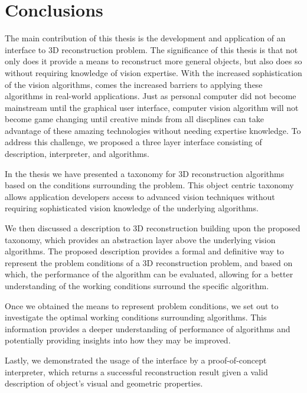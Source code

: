 
\chapter{Conclusions}
\label{ch:conclusion}
The main contribution of this thesis is the development and application of an interface to 3D reconstruction problem. The significance of this thesis is that not only does it provide a means to reconstruct more general objects, but also does so without requiring knowledge of vision expertise. With the increased sophistication of the vision algorithms, comes the increased barriers to applying these algorithms in real-world applications. Just as personal computer did not become mainstream until the graphical user interface, computer vision algorithm will not become game changing until creative minds from all discplines can take advantage of these amazing technologies without needing expertise knowledge. To address this challenge, we proposed a three layer interface consisting of description, interpreter, and algorithms.

In the thesis we have presented a taxonomy for 3D reconstruction algorithms based on the conditions surrounding the problem. This object centric taxonomy allows application developers access to advanced vision techniques without requiring sophisticated vision knowledge of the underlying algorithms.

We then discussed a description to 3D reconstruction building upon the proposed taxonomy, which provides an abstraction layer above the underlying vision algorithms. The proposed description provides a formal and definitive way to represent the problem conditions of a 3D reconstruction problem, and based on which, the performance of the algorithm can be evaluated, allowing for a better understanding of the working conditions surround the specific algorithm.

Once we obtained the means to represent problem conditions, we set out to investigate the optimal working conditions surrounding algorithms. This information provides a deeper understanding of performance of algorithms and potentially providing insights into how they may be improved.

Lastly, we demonstrated the usage of the interface by a proof-of-concept interpreter, which returns a successful reconstruction result given a valid description of object's visual and geometric properties.

